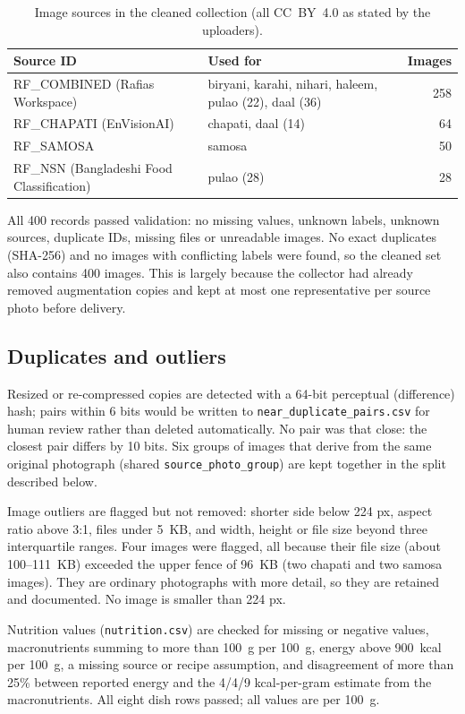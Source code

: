 \documentclass[11pt,a4paper]{article}
\begin{document}
\begin{table}[h]
\centering
\begin{tabular}{lp{5.6cm}r}
\hline
Source ID & Used for & Images \\ \hline
RF\_COMBINED (Rafias Workspace) & biryani, karahi, nihari, haleem, pulao (22), daal (36) & 258 \\
RF\_CHAPATI (EnVisionAI) & chapati, daal (14) & 64 \\
RF\_SAMOSA & samosa & 50 \\
RF\_NSN (Bangladeshi Food Classification) & pulao (28) & 28 \\ \hline
\end{tabular}
\caption{Image sources in the cleaned collection (all CC~BY~4.0 as stated by the uploaders).}
\label{tab:sources}
\end{table}

All 400 records passed validation: no missing values, unknown labels, unknown sources, duplicate IDs, missing files or unreadable images. No exact duplicates (SHA-256) and no images with conflicting labels were found, so the cleaned set also contains 400 images. This is largely because the collector had already removed augmentation copies and kept at most one representative per source photo before delivery.

\subsection{Duplicates and outliers}
Resized or re-compressed copies are detected with a 64-bit perceptual (difference) hash; pairs within 6 bits would be written to \texttt{near\_duplicate\_pairs.csv} for human review rather than deleted automatically. No pair was that close: the closest pair differs by 10 bits. Six groups of images that derive from the same original photograph (shared \texttt{source\_photo\_group}) are kept together in the split described below.

Image outliers are flagged but not removed: shorter side below 224 px, aspect ratio above 3:1, files under 5~KB, and width, height or file size beyond three interquartile ranges. Four images were flagged, all because their file size (about 100--111~KB) exceeded the upper fence of 96~KB (two chapati and two samosa images). They are ordinary photographs with more detail, so they are retained and documented. No image is smaller than 224 px.

Nutrition values (\texttt{nutrition.csv}) are checked for missing or negative values, macronutrients summing to more than 100~g per 100~g, energy above 900~kcal per 100~g, a missing source or recipe assumption, and disagreement of more than 25\% between reported energy and the 4/4/9 kcal-per-gram estimate from the macronutrients. All eight dish rows passed; all values are per 100~g.
\end{document}

